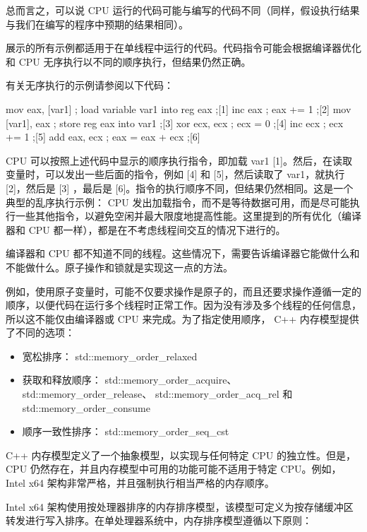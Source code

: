 总而言之，可以说 CPU 运行的代码可能与编写的代码不同（同样，假设执行结果与我们在编写的程序中预期的结果相同）。

展示的所有示例都适用于在单线程中运行的代码。代码指令可能会根据编译器优化和 CPU 无序执行以不同的顺序执行，但结果仍然正确。

有关无序执行的示例请参阅以下代码：

\begin{cpp}
mov eax, [var1] ; load variable var1 into reg eax ;[1]
inc eax ; eax += 1 ;[2]
mov [var1], eax ; store reg eax into var1 ;[3]
xor ecx, ecx ; ecx = 0 ;[4]
inc ecx ; ecx += 1 ;[5]
add eax, ecx ; eax = eax + ecx ;[6]
\end{cpp}

CPU 可以按照上述代码中显示的顺序执行指令，即加载 var1 [1]。然后，在读取变量时，可以发出一些后面的指令，例如 [4] 和 [5]，然后读取了 var1，就执行 [2]，然后是 [3] ，最后是 [6]。指令的执行顺序不同，但结果仍然相同。这是一个典型的乱序执行示例： CPU 发出加载指令，而不是等待数据可用，而是尽可能执行一些其他指令，以避免空闲并最大限度地提高性能。这里提到的所有优化（编译器和 CPU 都一样），都是在不考虑线程间交互的情况下进行的。

编译器和 CPU 都不知道不同的线程。这些情况下，需要告诉编译器它能做什么和不能做什么。原子操作和锁就是实现这一点的方法。

例如，使用原子变量时，可能不仅要求操作是原子的，而且还要求操作遵循一定的顺序，以便代码在运行多个线程时正常工作。因为没有涉及多个线程的任何信息，所以这不能仅由编译器或 CPU 来完成。为了指定使用顺序， C++ 内存模型提供了不同的选项：

\begin{itemize}
\item
宽松排序： std::memory\_order\_relaxed

\item
获取和释放顺序： std::memory\_order\_acquire、 std::memory\_order\_release、 std::memory\_order\_acq\_rel 和 std::memory\_order\_consume

\item
顺序一致性排序： std::memory\_order\_seq\_cst
\end{itemize}

C++ 内存模型定义了一个抽象模型，以实现与任何特定 CPU 的独立性。但是， CPU 仍然存在，并且内存模型中可用的功能可能不适用于特定 CPU。例如， Intel x64 架构非常严格，并且强制执行相当严格的内存顺序。

Intel x64 架构使用按处理器排序的内存排序模型，该模型可定义为按存储缓冲区转发进行写入排序。在单处理器系统中，内存排序模型遵循以下原则：

